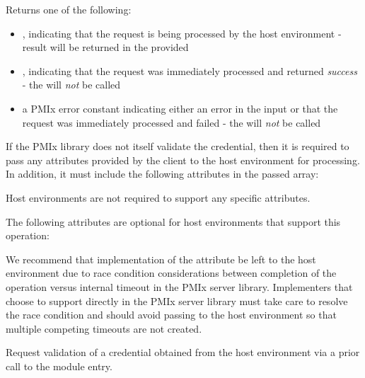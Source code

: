 Returns one of the following:

\begin{itemize}
    \item {}, indicating that the request is being processed by the host environment - result will be returned in the provided 
    \item {}, indicating that the request was immediately processed and returned \textit{success} - the  will \textit{not} be called
    \item a PMIx error constant indicating either an error in the input or that the request was immediately processed and failed - the  will \textit{not} be called
\end{itemize}

\reqattrstart
If the \ac{PMIx} library does not itself validate the credential, then it is required to pass any attributes provided by the client to the host environment for processing. In addition, it must include the following attributes in the passed  array:


Host environments are not required to support any specific attributes.

\reqattrend

\optattrstart
The following attributes are optional for host environments that support this operation:


\optattrend

\adviceimplstart
We recommend that implementation of the  attribute be left to the host environment due to race condition considerations between completion of the operation versus internal timeout in the \ac{PMIx} server library. Implementers that choose to support  directly in the \ac{PMIx} server library must take care to resolve the race condition and should avoid passing  to the host environment so that multiple competing timeouts are not created.
\adviceimplend


\descr

Request validation of a credential obtained from the host environment via a prior call to the  module entry.

\subsection{}

